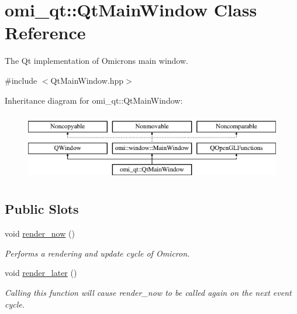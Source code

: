 \hypertarget{classomi__qt_1_1_qt_main_window}{}\section{omi\+\_\+qt\+:\+:Qt\+Main\+Window Class Reference}
\label{classomi__qt_1_1_qt_main_window}


The Qt implementation of Omicron\textquotesingle{}s main window.  




{\ttfamily \#include $<$Qt\+Main\+Window.\+hpp$>$}

Inheritance diagram for omi\+\_\+qt\+:\+:Qt\+Main\+Window\+:\begin{figure}[H]
\begin{center}
\leavevmode
\includegraphics[height=3.000000cm]{classomi__qt_1_1_qt_main_window}
\end{center}
\end{figure}
\subsection*{Public Slots}
\begin{DoxyCompactItemize}
\item 
void \hyperlink{classomi__qt_1_1_qt_main_window_a8380f23b2a96d0a67c1b95da03e53a9a}{render\+\_\+now} ()\hypertarget{classomi__qt_1_1_qt_main_window_a8380f23b2a96d0a67c1b95da03e53a9a}{}\label{classomi__qt_1_1_qt_main_window_a8380f23b2a96d0a67c1b95da03e53a9a}

\begin{DoxyCompactList}\small\item\em Performs a rendering and update cycle of Omicron. \end{DoxyCompactList}\item 
void \hyperlink{classomi__qt_1_1_qt_main_window_aa7df1b463c14fc344ffbe99dddcf5f65}{render\+\_\+later} ()\hypertarget{classomi__qt_1_1_qt_main_window_aa7df1b463c14fc344ffbe99dddcf5f65}{}\label{classomi__qt_1_1_qt_main_window_aa7df1b463c14fc344ffbe99dddcf5f65}

\begin{DoxyCompactList}\small\item\em Calling this function will cause render\+\_\+now to be called again on the next event cycle. \end{DoxyCompactList}\end{DoxyCompactItemize}
